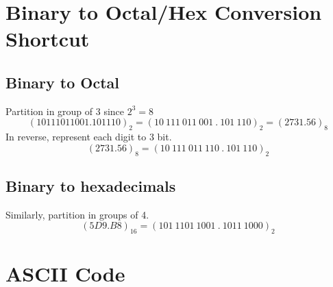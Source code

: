\documentclass[12pt]{article} %
\begin{document}
\section{Binary to Octal/Hex Conversion Shortcut}

\subsection*{Binary to Octal} 
Partition in group of 3 since \(2^3 = 8\)
\[(10111011001.101110)_2 = (10\ 111\ 011\ 001\ .\ 101\ 110)_2 = (2731.56)_8\]
In reverse, represent each digit to 3 bit.
\[(2731.56)_8 = (10\ 111\ 011\ 110\ .\ 101\ 110)_2\]
\subsection*{Binary to hexadecimals}
Similarly, partition in groups of 4.
\[(5D9.B8)_{16} = (101\ 1101\ 1001\ .\ 1011\ 1000)_2\] 

\section{ASCII Code}
\end{document}
